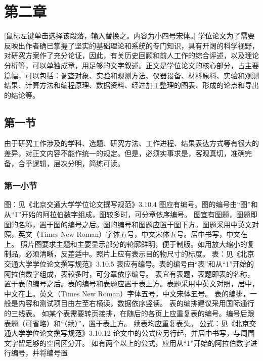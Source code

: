 \chapter{第二章}
[鼠标左键单击选择该段落，输入替换之。内容为小四号宋体。] 学位论文为了需要反映出作者确已掌握了坚实的基础理论和系统的专门知识，具有开阔的科学视野，对研究方案作了充分论证，因此，有关历史回顾和前人工作的综合评述，以及理论分析等，可以单独成章，用足够的文字叙述。正文是学位论文的核心部分，占主要篇幅，可以包括：调查对象、实验和观测方法、仪器设备、材料原料、实验和观测结果、计算方法和编程原理、数据资料、经过加工整理的图表、形成的论点和导出的结论等。

\section{第一节}

由于研究工作涉及的学科、选题、研究方法、工作进程、结果表达方式等有很大的差异，对正文内容不能作统一的规定。但是，必须实事求是，客观真切，准确完备，合乎逻辑，层次分明，简练可读。

\subsection{第一小节}

图：见《北京交通大学学位论文撰写规范》3.10.4
图应有编号。图的编号由“图”和从“1”开始的阿拉伯数字组成，图较多时，可分章依序编号。
图宜有图题，图题即图的名称，置于图的编号之后。图的编号和图题应置于图下方。图题采用中英文对照，英文（Times New Roman）字体五号，中文宋体五号。居中书写，中文在上。
照片图要求主题和主要显示部分的轮廓鲜明，便于制版。如用放大缩小的复制品，必须清晰，反差适中。照片上应有表示目的物尺寸的标度。
表：见《北京交通大学学位论文撰写规范》3.10.5
表应有编号。表的编号由“表”和从“1”开始的阿拉伯数字组成，表较多时，可分章依序编号。
表宜有表题，表题即表的名称，置于表的编号之后。表的编号和表题应置于表上方。表题采用中英文对照，居中，中文在上。英文（Times New Roman）字体五号，中文宋体五号。
表的编排，一般是内容和测试项目由左至右横读，数据依序竖读。
表的编排建议采用国际通行的三线表。
如某个表需要转页接排，在随后的各页上应重复表的编号。编号后跟表题（可省略）和“（续）”，置于表上方。
续表均应重复表头。
公式：见《北京交通大学学位论文撰写规范》3.10.12
论文中的公式应另行起，并居中书写，与周围文字留足够的空间区分开。
如有两个以上的公式，应用从“1”开始的阿拉伯数字进行编号，并将编号置
